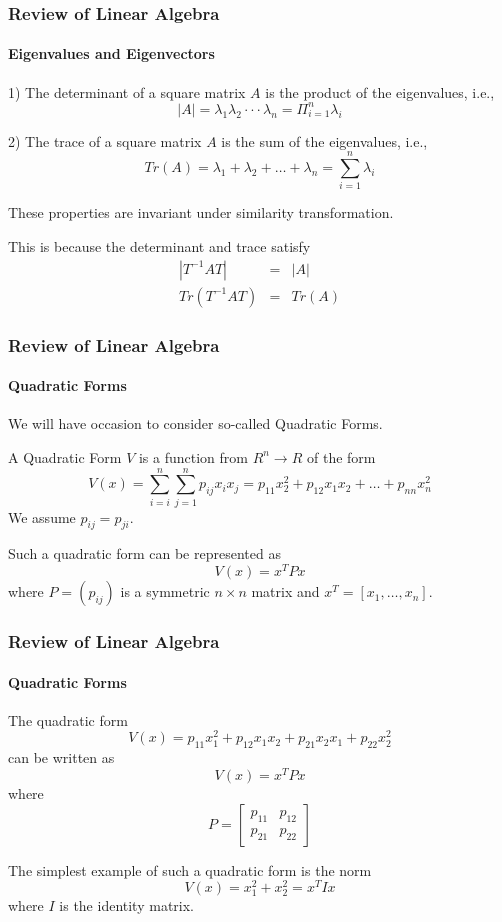 \begin{frame}
\frametitle{Review of Linear Algebra}
\framesubtitle{Eigenvalues and Eigenvectors}
\begin{remark}
1) The {\bor determinant} of a square matrix $A$ is the {\bor product} of the eigenvalues, i.e.,
$$
|A| = \lambda_1\lambda_2\cdot\cdot\cdot\lambda_n = \Pi_{i=1}^n\lambda_i
$$

2) The {\bor trace} of a square matrix $A$ is the {\bor sum} of the eigenvalues, i.e.,
$$
Tr(A) = \lambda_1 + \lambda_2 + \dots + \lambda_n = \sum_{i=1}^n \lambda_i
$$
\end{remark}
These properties are {\bor invariant} under {\bor similarity transformation}.

This is because the determinant and trace satisfy
\begin{eqnarray*}
|T^{-1}AT| &=& |A| \\
Tr(T^{-1}AT) &=& Tr(A)
\end{eqnarray*}
\end{frame}
\begin{frame}
\frametitle{Review of Linear Algebra}
\framesubtitle{Quadratic Forms}
We will have occasion to consider so-called {\bor Quadratic Forms}.
\begin{definition}
A {\bor Quadratic Form $V$} is a function from $R^n\rightarrow R$ of the form
$$
V(x) = \sum_{i=i}^n\sum_{j=1}^n p_{ij}x_ix_j = p_{11}x_2^2 + p_{12}x_1x_2 + \dots + p_{nn}x_n^2
$$
We assume $p_{ij}=p_{ji}$.
\end{definition}
Such a quadratic form can be represented as
$$
V(x) = x^T P x
$$
where $P = (p_{ij})$ is a symmetric $n\times n$ matrix and $x^T = [x_1,\dots,x_n]$.
\end{frame}
\begin{frame}
\frametitle{Review of Linear Algebra}
\framesubtitle{Quadratic Forms}
\begin{examp}
The quadratic form
$$
V(x) = p_{11}x_1^2 + p_{12}x_1x_2 + p_{21}x_2x_1 + p_{22}x_2^2
$$
can be written as
$$
V(x) = x^TPx
$$
where
$$
P = \left[\begin{array}{cc} p_{11} & p_{12} \\ p_{21} & p_{22} \end{array}\right]
$$
\end{examp}
The simplest example of such a quadratic form is the {\bor norm}
$$
V(x) = x_1^2 + x_2^2 = x^T I x
$$
where $I$ is the identity matrix.
\end{frame}

